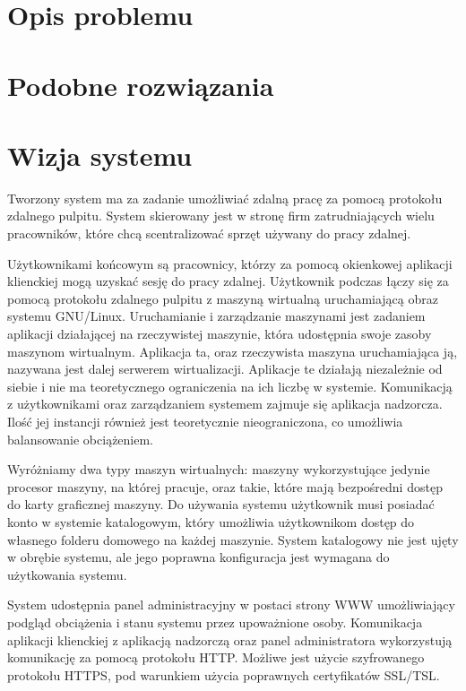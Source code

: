 \documentclass[../praca-dyplomowa.tex]{subfiles}
\begin{document}
\section{Opis problemu}


\section{Podobne rozwiązania}


\section{Wizja systemu}

Tworzony system ma za zadanie umożliwiać zdalną pracę za pomocą protokołu zdalnego pulpitu. System skierowany jest w stronę firm zatrudniających wielu pracowników, które chcą scentralizować sprzęt używany do pracy zdalnej.

Użytkownikami końcowym są pracownicy, którzy za pomocą okienkowej aplikacji klienckiej mogą uzyskać sesję do pracy zdalnej. Użytkownik podczas łączy się za pomocą protokołu zdalnego pulpitu z maszyną wirtualną uruchamiającą obraz systemu GNU/Linux. Uruchamianie i zarządzanie maszynami jest zadaniem aplikacji działającej na rzeczywistej maszynie, która udostępnia swoje zasoby maszynom wirtualnym. Aplikacja ta, oraz rzeczywista maszyna uruchamiająca ją, nazywana jest dalej serwerem wirtualizacji. Aplikacje te działają niezależnie od siebie i nie ma teoretycznego ograniczenia na ich liczbę w systemie. Komunikacją z użytkownikami oraz zarządzaniem systemem zajmuje się aplikacja nadzorcza. Ilość jej instancji również jest teoretycznie nieograniczona, co umożliwia balansowanie obciążeniem.

Wyróżniamy dwa typy maszyn wirtualnych: maszyny wykorzystujące jedynie procesor maszyny, na której pracuje, oraz takie, które mają bezpośredni dostęp do karty graficznej maszyny. Do używania systemu użytkownik musi posiadać konto w systemie katalogowym, który umożliwia użytkownikom dostęp do własnego folderu domowego na każdej maszynie. System katalogowy nie jest ujęty w obrębie systemu, ale jego poprawna konfiguracja jest wymagana do użytkowania systemu.

System udostępnia panel administracyjny w postaci strony WWW umożliwiający podgląd obciążenia i stanu systemu przez upoważnione osoby. Komunikacja aplikacji klienckiej z aplikacją nadzorczą oraz panel administratora wykorzystują komunikację za pomocą protokołu HTTP. Możliwe jest użycie szyfrowanego protokołu HTTPS, pod warunkiem użycia poprawnych certyfikatów SSL/TSL.
\end{document}
